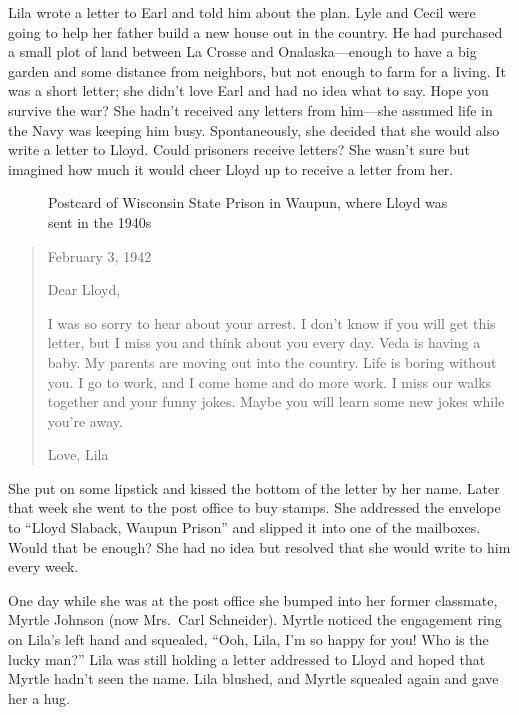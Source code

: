 \documentclass[
  letterpaper,
]{book}
\makeatletter
\newcommand*\pandocbounded[1]{%
  \sbox\pandoc@box{#1}%
  \Gscale@div\@tempa{\textheight}{\dimexpr\ht\pandoc@box+\dp\pandoc@box\relax}%
  \Gscale@div\@tempb{\linewidth}{\wd\pandoc@box}%
  \ifdim\@tempb\p@<\@tempa\p@\let\@tempa\@tempb\fi%
  \ifdim\@tempa\p@<\p@\scalebox{\@tempa}{\usebox\pandoc@box}%
  \else\usebox{\pandoc@box}%
  \fi%
}
\makeatother
\begin{document}
Lila wrote a letter to Earl and told him about the plan. Lyle and Cecil
were going to help her father build a new house out in the country. He
had purchased a small plot of land between La Crosse and
Onalaska---enough to have a big garden and some distance from neighbors,
but not enough to farm for a living. It was a short letter; she didn't
love Earl and had no idea what to say. Hope you survive the war? She
hadn't received any letters from him---she assumed life in the Navy was
keeping him busy. Spontaneously, she decided that she would also write a
letter to Lloyd. Could prisoners receive letters? She wasn't sure but
imagined how much it would cheer Lloyd up to receive a letter from her.

\begin{figure}[H]

{\centering \pandocbounded{\texttt{[image: images/Akou14rt.jpg]}}

}

\caption[Postcard of Wisconsin State Prison in Waupun]{Postcard of
Wisconsin State Prison in Waupun, where Lloyd was sent in the 1940s}

\end{figure}%

\begin{quote}
February 3, 1942

Dear Lloyd,

I was so sorry to hear about your arrest. I don't know if you will get
this letter, but I miss you and think about you every day. Veda is
having a baby. My parents are moving out into the country. Life is
boring without you. I go to work, and I come home and do more work. I
miss our walks together and your funny jokes. Maybe you will learn some
new jokes while you're away.

Love, Lila
\end{quote}

She put on some lipstick and kissed the bottom of the letter by her
name. Later that week she went to the post office to buy stamps. She
addressed the envelope to ``Lloyd Slaback, Waupun Prison'' and slipped
it into one of the mailboxes. Would that be enough? She had no idea but
resolved that she would write to him every week.

One day while she was at the post office she bumped into her former
classmate, Myrtle Johnson (now Mrs.~Carl Schneider). Myrtle noticed the
engagement ring on Lila's left hand and squealed, ``Ooh, Lila, I'm so
happy for you! Who is the lucky man?'' Lila was still holding a letter
addressed to Lloyd and hoped that Myrtle hadn't seen the name. Lila
blushed, and Myrtle squealed again and gave her a hug.
\end{document}
